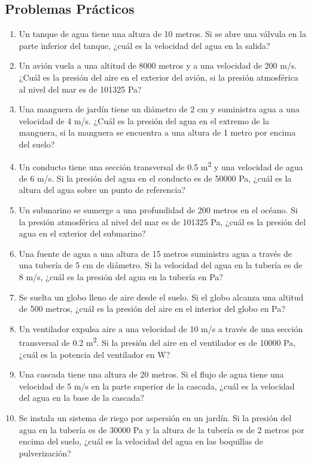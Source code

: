 \documentclass[../main]{subfiles}
\begin{document}
\subsection{Problemas Prácticos}

\begin{enumerate}
    \item Un tanque de agua tiene una altura de 10 metros. Si se abre una válvula en la parte inferior del tanque, ¿cuál es la velocidad del agua en la salida?
    \item Un avión vuela a una altitud de 8000 metros y a una velocidad de 200 m/s. ¿Cuál es la presión del aire en el exterior del avión, si la presión atmosférica al nivel del mar es de 101325 Pa?
    \item Una manguera de jardín tiene un diámetro de 2 cm y suministra agua a una velocidad de 4 m/s. ¿Cuál es la presión del agua en el extremo de la manguera, si la manguera se encuentra a una altura de 1 metro por encima del suelo?
    \item Un conducto tiene una sección transversal de 0.5 m\textsuperscript{2} y una velocidad de agua de 6 m/s. Si la presión del agua en el conducto es de 50000 Pa, ¿cuál es la altura del agua sobre un punto de referencia?
    \item Un submarino se sumerge a una profundidad de 200 metros en el océano. Si la presión atmosférica al nivel del mar es de 101325 Pa, ¿cuál es la presión del agua en el exterior del submarino?
    \item Una fuente de agua a una altura de 15 metros suministra agua a través de una tubería de 5 cm de diámetro. Si la velocidad del agua en la tubería es de 8 m/s, ¿cuál es la presión del agua en la tubería en Pa?
    \item Se suelta un globo lleno de aire desde el suelo. Si el globo alcanza una altitud de 500 metros, ¿cuál es la presión del aire en el interior del globo en Pa?
    \item Un ventilador expulsa aire a una velocidad de 10 m/s a través de una sección transversal de 0.2 m\textsuperscript{2}. Si la presión del aire en el ventilador es de 10000 Pa, ¿cuál es la potencia del ventilador en W?
    \item Una cascada tiene una altura de 20 metros. Si el flujo de agua tiene una velocidad de 5 m/s en la parte superior de la cascada, ¿cuál es la velocidad del agua en la base de la cascada?
    \item Se instala un sistema de riego por aspersión en un jardín. Si la presión del agua en la tubería es de 30000 Pa y la altura de la tubería es de 2 metros por encima del suelo, ¿cuál es la velocidad del agua en las boquillas de pulverización?
\end{enumerate}
\end{document}
